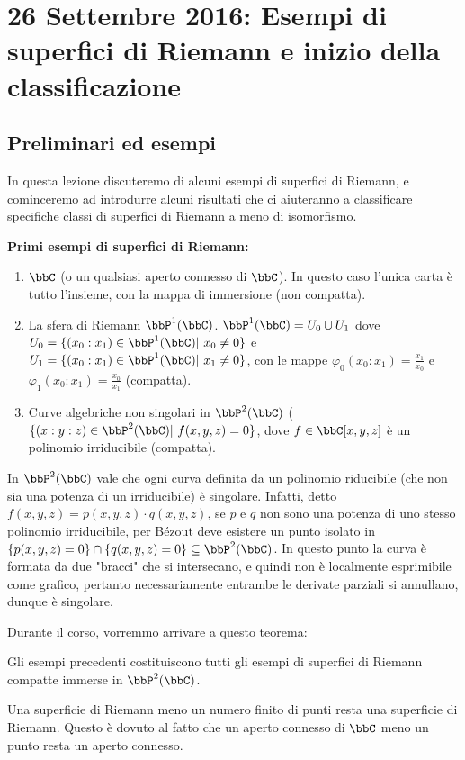 \chapter{26 Settembre 2016: Esempi di superfici di Riemann e inizio della classificazione}

\section{Preliminari ed esempi}
In questa lezione discuteremo di alcuni esempi di superfici di Riemann, e cominceremo ad introdurre alcuni risultati che ci aiuteranno a classificare specifiche classi di superfici di Riemann a meno di isomorfismo.



\textbf{Primi esempi di superfici di Riemann:}
\begin{enumerate}
  \item $\bbC$ (o un qualsiasi aperto connesso di $\bbC$). In questo caso l'unica carta è tutto l'insieme, con la mappa di immersione (non compatta).
  \item La sfera di Riemann $\bbP^1(\bbC)$. $\bbP^1(\bbC)=U_0\cup U_1$ dove $U_0=\{(x_0:x_1)\in \bbP^1(\bbC) | \ x_0\neq 0\}$ e $U_1=\{(x_0:x_1)\in \bbP^1(\bbC) | \ x_1\neq 0\}$, con le mappe $\varphi_0(x_0:x_1)=\frac{x_1}{x_0}$ e $\varphi_1(x_0:x_1)=\frac{x_0}{x_1}$ (compatta).
  \item Curve algebriche non singolari in $\bbP^2(\bbC)$ ($\{(x:y:z)\in \bbP^2(\bbC) | \ f(x,y,z)=0\}$, dove $f\in \bbC[x,y,z]$ è un polinomio irriducibile (compatta). %
\end{enumerate}
\begin{osservazione}
    In $\bbP^2(\bbC)$ vale che ogni curva definita da un polinomio riducibile (che non sia una potenza di un irriducibile) è singolare. Infatti, detto $f(x,y,z)=p(x,y,z)\cdot q(x,y,z)$, se $p$ e $q$ non sono una potenza di uno stesso polinomio irriducibile, per Bézout deve esistere un punto isolato in $\{p(x,y,z)=0\}\cap\{q(x,y,z)=0\}\subseteq \bbP^2(\bbC)$. In questo punto la curva è formata da due "bracci" che si intersecano, e quindi non è localmente esprimibile come grafico, pertanto necessariamente entrambe le derivate parziali si annullano, dunque è singolare. %
\end{osservazione}
Durante il corso, vorremmo arrivare a questo teorema:
\begin{teorema}[di Chow]
    Gli esempi precedenti costituiscono tutti gli esempi di superfici di Riemann compatte immerse in $\bbP^2(\bbC)$.
\end{teorema}
\begin{osservazione}
    Una superficie di Riemann meno un numero finito di punti resta una superficie di Riemann. Questo è dovuto al fatto che un aperto connesso di $\bbC$ meno un punto resta un aperto connesso.
\end{osservazione}


